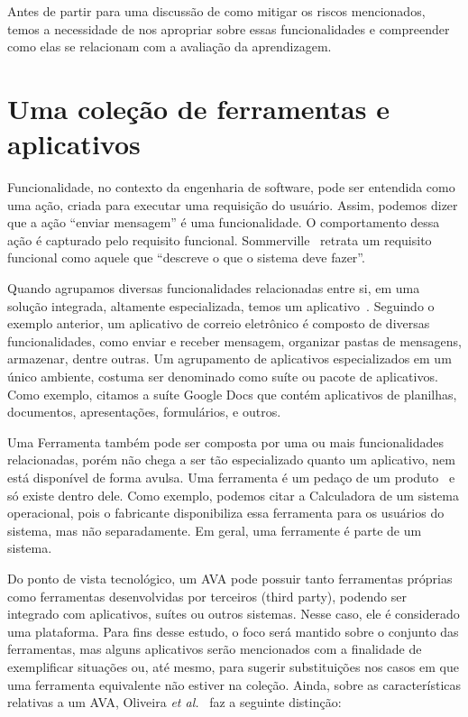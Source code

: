 Antes de partir para uma discussão de como mitigar os riscos mencionados, temos a necessidade de nos apropriar sobre essas funcionalidades e compreender como elas se relacionam com a avaliação da aprendizagem.


\section{Uma coleção de ferramentas e aplicativos}%

Funcionalidade, no contexto da engenharia de software, pode ser entendida como uma ação, criada para executar uma requisição do usuário. Assim, podemos dizer que a ação ``enviar mensagem'' é uma funcionalidade. O comportamento dessa ação é capturado pelo requisito funcional. Sommerville~\cite{sommerville2011eng} retrata um requisito funcional como aquele que ``descreve o que o sistema deve fazer''. 

Quando agrupamos diversas funcionalidades relacionadas entre si, em uma solução integrada, altamente especializada, temos um aplicativo~\cite{martins@tecnicas}. Seguindo o exemplo anterior, um aplicativo de correio eletrônico é composto de diversas funcionalidades, como enviar e receber mensagem, organizar pastas de mensagens, armazenar, dentre outras. Um agrupamento de aplicativos especializados em um único ambiente, costuma ser denominado como suíte ou pacote de aplicativos. Como exemplo, citamos a suíte Google Docs que contém aplicativos de planilhas, documentos, apresentações, formulários, e outros.

Uma Ferramenta também pode ser composta por uma ou mais funcionalidades relacionadas, porém não chega a ser tão especializado quanto um aplicativo, nem está disponível de forma avulsa. Uma ferramenta é um pedaço de um produto~\cite{martins@tecnicas} e só existe dentro dele. Como exemplo, podemos citar a Calculadora de um sistema operacional, pois o fabricante disponibiliza essa ferramenta para os usuários do sistema, mas não separadamente. Em geral, uma ferramente é parte de um sistema.

Do ponto de vista tecnológico, um AVA pode possuir tanto ferramentas próprias como ferramentas desenvolvidas por terceiros (third party), podendo ser integrado com aplicativos, suítes ou outros sistemas. Nesse caso, ele é considerado uma plataforma. Para fins desse estudo, o foco será mantido sobre o conjunto das ferramentas, mas alguns aplicativos serão mencionados com a finalidade de exemplificar situações ou, até mesmo, para sugerir substituições nos casos em que uma ferramenta equivalente não estiver na coleção. Ainda, sobre as características relativas a um AVA, Oliveira \textit{et al.}~\cite{dotta@ead} faz a seguinte distinção:

